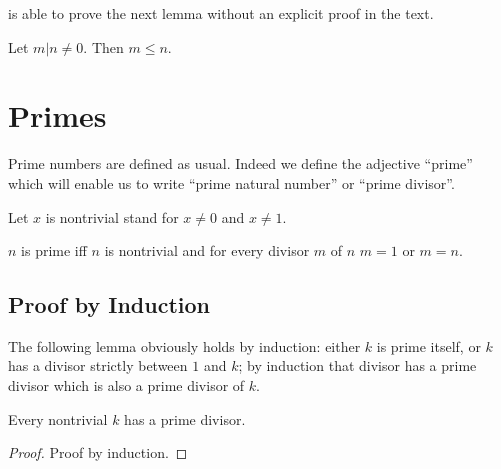 \documentclass[11pt]{article}
\begin{document}
\Naproche is able to prove the next lemma without an
explicit proof in the text.

\begin{forthel}

\begin{lemma} Let $m | n \neq 0$. Then $m \leq n$.
\end{lemma}

\end{forthel}

\section{Primes}

Prime numbers are defined as usual. Indeed we define
the adjective ``prime'' which will enable us
to write ``prime natural number'' or ``prime divisor''.

\begin{forthel}

Let $x$ is nontrivial stand for $x \neq 0$ and $x \neq 1$.

\begin{definition}
$n$ is prime iff $n$ is nontrivial and
    for every divisor $m$ of $n$ $m = 1$ or $m = n$.
\end{definition}

\end{forthel}
\subsection{Proof by Induction}
The following lemma obviously holds by induction: either
$k$ is prime itself, or $k$ has a divisor strictly
between $1$ and $k$; by induction that divisor has a prime
divisor which is also a prime divisor of $k$.

\begin{forthel}

\begin{lemma} Every nontrivial $k$ has a prime divisor.
\end{lemma}
\begin{proof} Proof by induction.
\end{proof}

\end{forthel}
\end{document}
